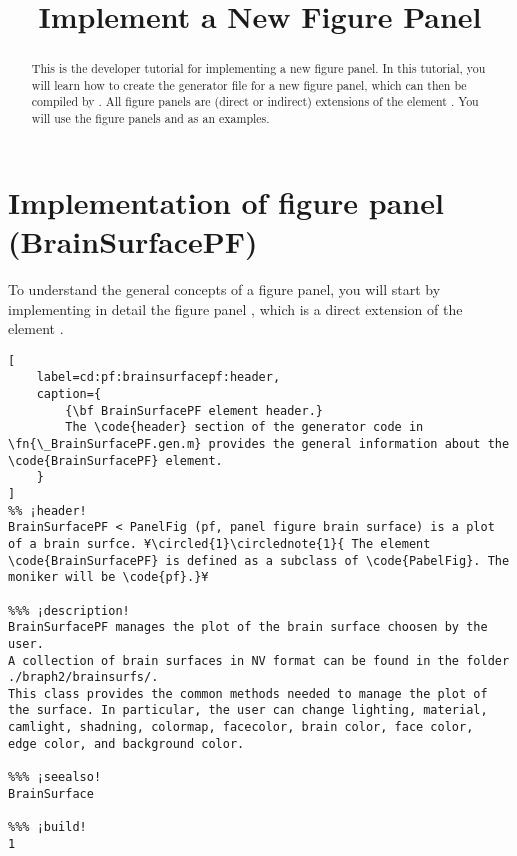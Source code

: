 \documentclass{tufte-handout}
\title{Implement a New Figure Panel}
\begin{document}
\maketitle

\begin{abstract}
\noindent
This is the developer tutorial for implementing a new figure panel. 
In this tutorial, you will learn how to create the generator file  for a new figure panel, which can then be compiled by . 
All figure panels are (direct or indirect) extensions of the element .
You will use the figure panels  and  as an examples.
\end{abstract}

\tableofcontents

\clearpage

\section{Implementation of figure panel (BrainSurfacePF)}

To understand the general concepts of a figure panel, you will start by implementing in detail the figure panel , which is a direct extension of the element .

\begin{lstlisting}[
	label=cd:pf:brainsurfacepf:header,
	caption={
		{\bf BrainSurfacePF element header.}
		The \code{header} section of the generator code in \fn{\_BrainSurfacePF.gen.m} provides the general information about the \code{BrainSurfacePF} element.
	}
]
%% ¡header!
BrainSurfacePF < PanelFig (pf, panel figure brain surface) is a plot of a brain surfce. ¥\circled{1}\circlednote{1}{ The element \code{BrainSurfacePF} is defined as a subclass of \code{PabelFig}. The moniker will be \code{pf}.}¥

%%% ¡description!
BrainSurfacePF manages the plot of the brain surface choosen by the user. 
A collection of brain surfaces in NV format can be found in the folder 
./braph2/brainsurfs/.
This class provides the common methods needed to manage the plot of 
the surface. In particular, the user can change lighting, material, 
camlight, shadning, colormap, facecolor, brain color, face color, 
edge color, and background color. 

%%% ¡seealso!
BrainSurface

%%% ¡build!
1
\end{lstlisting}
\end{document}
